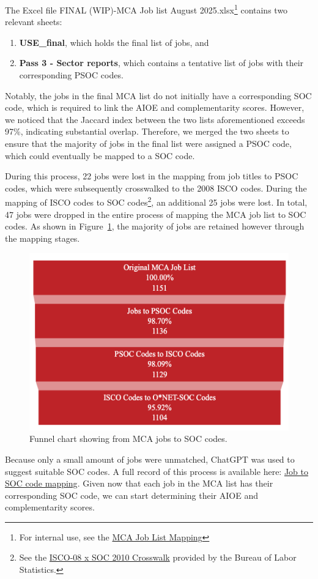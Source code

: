 The Excel file FINAL (WIP)-MCA Job list August 2025.xlsx\footnote{For internal use, see the \href{https://wadhwanifoundation.sharepoint.com/:x:/s/WSNPHTeam/EUsY7sQyUBFHqor6VOu44JYB2e_2cuOogu2f1SW3D0KtiQ?e=Cbtezq}{MCA Job List Mapping}} contains two relevant sheets: 
\begin{enumerate}
    \item \textbf{USE\_final}, which holds the final list of jobs, and 
    \item \textbf{Pass 3 - Sector reports}, which contains a tentative list of jobs with their corresponding PSOC codes. 
\end{enumerate}
Notably, the jobs in the final MCA list do not initially have a corresponding SOC code, which is required to link the AIOE and complementarity scores. 
However, we noticed that the Jaccard index between the two lists aforementioned exceeds 97\%, indicating substantial overlap.  
Therefore, we merged the two sheets to ensure that the majority of jobs in the final list were assigned a PSOC code, which could eventually be mapped to a SOC code. 

During this process, 22 jobs were lost in the mapping from job titles to PSOC codes, which were subsequently crosswalked to the 2008 ISCO codes.
During the mapping of ISCO codes to SOC codes\footnote{See the \href{https://www.bls.gov/soc/isco_soc_crosswalk.xls}{ISCO-08 x SOC 2010 Crosswalk} provided by the Bureau of Labor Statistics.}, 
an additional 25 jobs were lost. In total, 47 jobs were dropped in the entire process of mapping the MCA job list to SOC codes. As shown in Figure~\ref{fig:funnel_chart}, the majority of jobs are retained however through the mapping stages.  

\begin{figure}[ht] 
    \centering 
    \includegraphics[width=0.8\linewidth]{../figures/funnel_jobs.png} 
    \caption{Funnel chart showing from MCA jobs to SOC codes.} 
    \label{fig:funnel_chart} 
\end{figure}

Because only a small amount of jobs were unmatched, ChatGPT was used to suggest suitable SOC codes. A full record of this process is available here: \href{https://chatgpt.com/share/68ca0dd0-46e0-8012-be0a-e825db6ec12f}{Job to SOC code mapping}.
Given now that each job in the MCA list has their corresponding SOC code, we can start determining their AIOE and complementarity scores.

